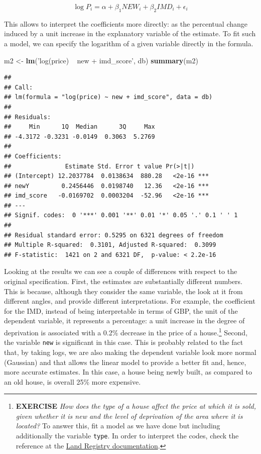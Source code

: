 \documentclass[]{book}
\newenvironment{Shaded}{\begin{snugshade}}{\end{snugshade}}
\newcommand{\KeywordTok}[1]{\textcolor[rgb]{0.13,0.29,0.53}{\textbf{#1}}}
\newcommand{\StringTok}[1]{\textcolor[rgb]{0.31,0.60,0.02}{#1}}
\newcommand{\NormalTok}[1]{#1}
\begin{document}
\[
\log{P_i} = \alpha + \beta_1 NEW_i + \beta_2 IMD_i + \epsilon_i
\]

This allows to interpret the coefficients more directly: as the
percentual change induced by a unit increase in the explanatory variable
of the estimate. To fit such a model, we can specify the logarithm of a
given variable directly in the formula.

\begin{Shaded}
\begin{Highlighting}[]
\NormalTok{m2 <-}\StringTok{ }\KeywordTok{lm}\NormalTok{(}\StringTok{'log(price) ~ new + imd_score'}\NormalTok{, db)}
\KeywordTok{summary}\NormalTok{(m2)}
\end{Highlighting}
\end{Shaded}

\begin{verbatim}
## 
## Call:
## lm(formula = "log(price) ~ new + imd_score", data = db)
## 
## Residuals:
##     Min      1Q  Median      3Q     Max 
## -4.3172 -0.3231 -0.0149  0.3063  5.2769 
## 
## Coefficients:
##               Estimate Std. Error t value Pr(>|t|)    
## (Intercept) 12.2037784  0.0138634  880.28   <2e-16 ***
## newY         0.2456446  0.0198740   12.36   <2e-16 ***
## imd_score   -0.0169702  0.0003204  -52.96   <2e-16 ***
## ---
## Signif. codes:  0 '***' 0.001 '**' 0.01 '*' 0.05 '.' 0.1 ' ' 1
## 
## Residual standard error: 0.5295 on 6321 degrees of freedom
## Multiple R-squared:  0.3101, Adjusted R-squared:  0.3099 
## F-statistic:  1421 on 2 and 6321 DF,  p-value: < 2.2e-16
\end{verbatim}

Looking at the results we can see a couple of differences with respect
to the original specification. First, the estimates are substantially
different numbers. This is because, although they consider the same
variable, the look at it from different angles, and provide different
interpretations. For example, the coefficient for the IMD, instead of
being interpretable in terms of GBP, the unit of the dependent variable,
it represents a percentage: a unit increase in the degree of deprivation
is associated with a 0.2\% decrease in the price of a house.\footnote{\textbf{EXERCISE}
  \emph{How does the type of a house affect the price at which it is
  sold, given whether it is new and the level of deprivation of the area
  where it is located?} To answer this, fit a model as we have done but
  including additionally the variable \texttt{type}. In order to
  interpret the codes, check the reference at the
  \href{https://www.gov.uk/guidance/about-the-price-paid-data\#explanations-of-column-headers-in-the-ppd}{Land
  Registry documentation}.} Second, the variable \texttt{new} is
significant in this case. This is probably related to the fact that, by
taking logs, we are also making the dependent variable look more normal
(Gaussian) and that allows the linear model to provide a better fit and,
hence, more accurate estimates. In this case, a house being newly built,
as compared to an old house, is overall 25\% more expensive.
\end{document}
